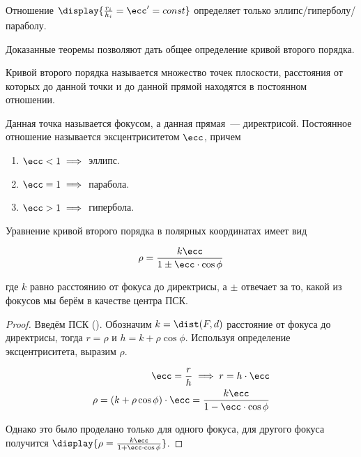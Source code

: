 \begin{theorem}
  Отношение \(\display{\frac{r_i}{h_i} = \ecc' = const}\) определяет только
  эллипс/гиперболу/параболу.
\end{theorem}

Доказанные теоремы позволяют дать общее определение кривой второго порядка.

\begin{definition}
  Кривой второго порядка называется множество точек плоскости, расстояния от
  которых до данной точки и до данной прямой находятся в постоянном отношении.

  Данная точка называется фокусом, а данная прямая~--- директрисой. Постоянное
  отношение называется эксцентриситетом \(\ecc\), причем

  \begin{enumerate}
    \item
      \(\ecc < 1 \implies\) эллипс.

    \item
      \(\ecc = 1 \implies\) парабола.

    \item
      \(\ecc > 1 \implies\) гипербола.
  \end{enumerate}
\end{definition}

\begin{theorem}
  Уравнение кривой второго порядка в полярных координатах имеет вид
  
  \begin{equation*}
    \rho = \frac{k \ecc}{1 \pm \ecc \cdot \cos \phi}    
  \end{equation*}

  где \(k\) равно расстоянию от фокуса до директрисы, а \(\pm\) отвечает за то,
  какой из фокусов мы берём в качестве центра ПСК.
\end{theorem}

\begin{proof}
  Введём  ПСК (). Обозначим \(k = \dist(F, d)\)
  расстояние от фокуса до директрисы, тогда \(r = \rho\) и \(h = k + \rho \cos
  \phi\). Используя определение эксцентриситета, выразим \(\rho\).

  \begin{equation*}
    \begin{aligned}
      \ecc = \frac{r}{h} \implies r = h \cdot \ecc
    \\
      \rho
      = (k + \rho \cos \phi) \cdot \ecc
      = \frac{k \ecc}{1 - \ecc \cdot \cos \phi}
    \end{aligned}
  \end{equation*}
  
  Однако это было проделано только для одного фокуса, для другого фокуса
  получится \(\display{\rho = \frac{k \ecc}{1 + \ecc \cdot \cos \phi}}\).
\end{proof}

